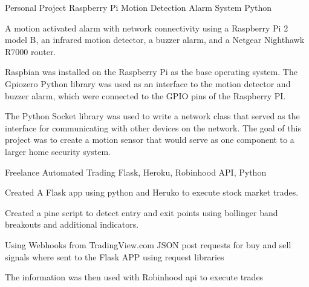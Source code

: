 

\begin{cventries}
  

  \cventry
    {Personal Project} %
    {Raspberry Pi Motion Detection Alarm System} %
    {}%
    {\textcolor{MyBlue}{Python}} %
    {
      \begin{cvitems} %
        \item {A motion activated alarm with network connectivity using a Raspberry Pi 2 model B, an infrared motion detector, a buzzer alarm, and a Netgear Nighthawk R7000 router.}
        \item {Raspbian was installed on the Raspberry Pi as the base operating system. The Gpiozero Python library was used as an interface to the motion detector and buzzer alarm, which were connected to the GPIO pins of the Raspberry PI. }
        \item {The Python Socket library was used to write a network class that served as the interface for communicating with other devices on the network. The goal of this project was to create a motion sensor that would serve as one component to a larger home security system.}
        \end{cvitems}
    }
    
 

\cventry
    {Freelance} %
    {Automated Trading} %
    {} %
    {\textcolor{MyBlue}{Flask, Heroku, Robinhood API, Python}} %
    {
      \begin{cvitems} %
       \item{Created A Flask app using python and Heruko to execute stock market trades.}
        \item {Created a pine script to detect entry and exit points using bollinger band breakouts and additional indicators. } 
        \item{Using Webhooks from TradingView.com JSON post requests for buy and sell signals where sent to the Flask APP using request libraries}
        \item {The information was then used with Robinhood api to execute trades}
      \end{cvitems}
    }


\end{cventries}
